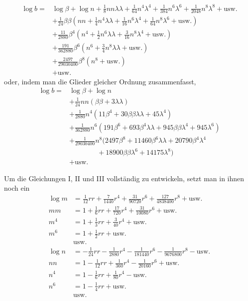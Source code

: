 \[
\begin{aligned}
\log b={}&\log\beta+\log n+\tfrac18nn\lambda\lambda+\tfrac1{64}n^4\lambda^4+\tfrac1{384}n^6\lambda^6+\tfrac1{2048}n^8\lambda^8+\text{usw.}\\
&+\tfrac1{24}\beta\beta(nn+\tfrac14n^4\lambda\lambda+\tfrac1{16}n^6\lambda^4+\tfrac1{64}n^8\lambda^6+\text{usw.})\\
&+\tfrac{11}{2880}\beta^4(n^4+\tfrac12n^6\lambda\lambda+\tfrac3{16}n^8\lambda^4+\text{usw.})\\
&+\tfrac{191}{362880}\beta^6(n^6+\tfrac34n^8\lambda\lambda+\text{usw.})\\
&+\tfrac{2497}{29030400}\beta^8(n^8+\text{usw.})\\
&+\text{usw.}
\end{aligned}
\]
oder, indem man die Glieder gleicher Ordnung zusammenfasst,
\[
\begin{aligned}
\log b={}&\log\beta+\log n\\
&+\tfrac1{24}nn(\beta\beta+3\lambda\lambda)\\
&+\tfrac1{2880}n^4(11\beta^4+30\beta\beta\lambda\lambda+45\lambda^4)\\
&+\tfrac1{362880}n^6(191\beta^6+693\beta^4\lambda\lambda+945\beta\beta\lambda^4+945\lambda^6)\\
&+\tfrac1{29030400}n^8(2497\beta^8+11460\beta^6\lambda\lambda+20790\beta^4\lambda^4\\
&\qquad\qquad+18900\beta\beta\lambda^6+14175\lambda^8)\\
&+\text{usw.}
\end{aligned}
\]

\indent Um die Gleichungen I, II und III vollständig zu entwickeln, setzt man in ihnen noch ein
\[
\begin{aligned}
\log m&=\tfrac1{12}rr+\tfrac7{1440}r^4+\tfrac{31}{90720}r^6+\tfrac{127}{4838400}r^8+\text{usw.}\\
mm&=1+\tfrac16rr+\tfrac{17}{720}r^4+\tfrac{31}{10080}r^6+\text{usw.}\\
m^4&=1+\tfrac13rr+\tfrac3{40}r^4+\text{usw.}\\
m^6&=1+\tfrac12rr+\text{usw.}\\
&\text{usw.}\\
\log n&=-\tfrac1{24}rr-\tfrac1{2880}r^4-\tfrac1{181440}r^6-\tfrac1{9676800}r^8-\text{usw.}\\
nn&=1-\tfrac1{12}rr+\tfrac1{360}r^4-\tfrac1{20160}r^6+\text{usw.}\\
n^4&=1-\tfrac16rr+\tfrac1{80}r^4-\text{usw.}\\
n^6&=1-\tfrac14rr+\text{usw.}\\
&\text{usw.}
\end{aligned}
\]

